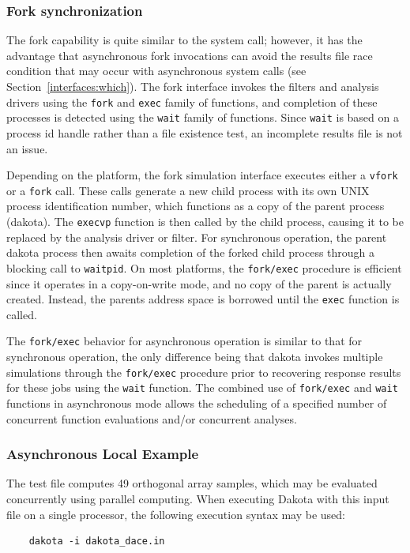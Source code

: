 \subsubsection{Fork synchronization}\label{parallel:SLP:local:fork}

The fork capability is quite similar to the system call; however, it
has the advantage that asynchronous fork invocations can avoid the
results file race condition that may occur with asynchronous system
calls (see Section~\ref{interfaces:which}). The fork interface invokes
the filters and analysis drivers using the \texttt{fork} and
\texttt{exec} family of functions, and completion of these processes
is detected using the \texttt{wait} family of functions. Since
\texttt{wait} is based on a process id handle rather than a file
existence test, an incomplete results file is not an issue.

Depending on the platform, the fork simulation interface executes
either a \texttt{vfork} or a \texttt{fork} call. These calls generate
a new child process with its own UNIX process identification number,
which functions as a copy of the parent process (dakota). The
\texttt{execvp} function is then called by the child process, causing
it to be replaced by the analysis driver or filter. For synchronous
operation, the parent dakota process then awaits completion of the
forked child process through a blocking call to \texttt{waitpid}. On
most platforms, the \texttt{fork/exec} procedure is efficient since it
operates in a copy-on-write mode, and no copy of the parent is
actually created. Instead, the parents address space is borrowed until
the \texttt{exec} function is called.

The \texttt{fork/exec} behavior for asynchronous operation is similar
to that for synchronous operation, the only difference being that
dakota invokes multiple simulations through the \texttt{fork/exec}
procedure prior to recovering response results for these jobs using
the \texttt{wait} function. The combined use of \texttt{fork/exec} and
\texttt{wait} functions in asynchronous mode allows the scheduling of
a specified number of concurrent function evaluations and/or
concurrent analyses.

\subsubsection{Asynchronous Local Example}\label{parallel:SLP:local:ex}

The test file  computes 49
orthogonal array samples, which may be evaluated concurrently using
parallel computing.  When executing Dakota with this input file on a
single processor, the following execution syntax may be used:
\begin{small}
\begin{verbatim}
    dakota -i dakota_dace.in
\end{verbatim}
\end{small}

